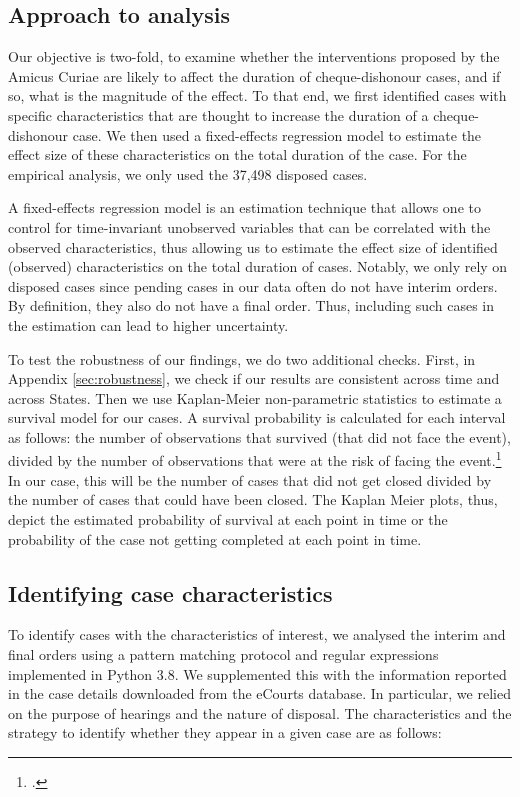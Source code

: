 \subsection{Approach to analysis} \label{sec:approach-analysis}

Our objective is two-fold, to examine whether the interventions proposed by the Amicus Curiae are likely to affect the duration of cheque-dishonour cases, and if so, what is the magnitude of the effect. To that end, we first identified cases with specific characteristics that are thought to increase the duration of a cheque-dishonour case. We then used a fixed-effects regression model to estimate the effect size of these characteristics on the total duration of the case. For the empirical analysis, we only used the 37,498 disposed cases.

A fixed-effects regression model is an estimation technique that allows one to control for time-invariant unobserved variables that can be correlated with the observed characteristics, thus allowing us to estimate the effect size of identified (observed) characteristics on the total duration of cases. Notably, we only rely on disposed cases since pending cases in our data often do not have interim orders. By definition, they also do not have a final order. Thus, including such cases in the estimation can lead to higher uncertainty.

To test the robustness of our findings, we do two additional checks. First, in Appendix \ref{sec:robustness}, we check if our results are consistent across time and across States. Then we use Kaplan-Meier non-parametric statistics to estimate a survival model for our cases. A survival probability is calculated for each interval as follows: the number of observations that survived (that did not face the event), divided by the number of observations that were at the risk of facing the event.\footcite{rich2010practical} In our case, this will be the number of cases that did not get closed divided by the number of cases that could have been closed. The Kaplan Meier plots, thus, depict the estimated probability of survival at each point in time or the probability of the case not getting completed at each point in time.

\subsection{Identifying case characteristics} \label{sec:text-mining}

To identify cases with the characteristics of interest, we analysed the interim and final orders using a pattern matching protocol and regular expressions implemented in Python 3.8. We supplemented this with the information reported in the case details downloaded from the eCourts database. In particular, we relied on the purpose of hearings and the nature of disposal. The characteristics and the strategy to identify whether they appear in a given case are as follows:

